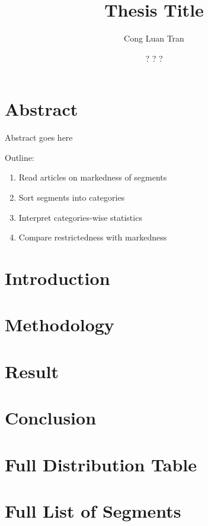 \documentclass[12pt]{report}
\title{Thesis Title}
\author{Cong Luan Tran}
\date{? ? ?}
\begin{document}


\chapter*{Abstract}
Abstract goes here

Outline:
\begin{enumerate}
    \item Read articles on markedness of segments
    \item Sort segments into categories
    \item Interpret categories-wise statistics  
    \item Compare restrictedness with markedness
\end{enumerate}

\tableofcontents

\chapter{Introduction}


\chapter{Methodology}


\chapter{Result}


\chapter{Conclusion}


\appendix
\chapter{Full Distribution Table}


\chapter{Full List of Segments}


\printbibliography
\end{document}
